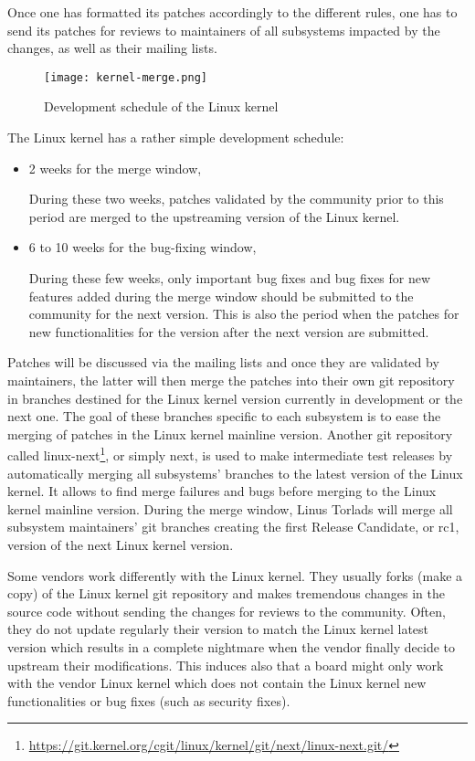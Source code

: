Once one has formatted its patches accordingly to the different rules, one has to send its patches for reviews to maintainers of all subsystems impacted by the changes, as well as their mailing lists.

\begin{figure}[H]
  \texttt{[image: kernel-merge.png]}
  \caption{Development schedule of the Linux kernel}
\end{figure}

The Linux kernel has a rather simple development schedule:
\begin{itemize}
  \item 2 weeks for the merge window,

During these two weeks, patches validated by the community prior to this period are merged to the upstreaming version of the Linux kernel.

  \item 6 to 10 weeks for the bug-fixing window,

During these few weeks, only important bug fixes and bug fixes for new features added during the merge window should be submitted to the community for the next version. This is also the period when the patches for new functionalities for the version after the next version are submitted.
\end{itemize}

Patches will be discussed via the mailing lists and once they are validated by maintainers, the latter will then merge the patches into their own git repository in branches destined for the Linux kernel version currently in development or the next one. The goal of these branches specific to each subsystem is to ease the merging of patches in the Linux kernel mainline version. Another git repository called linux-next\footnote{\url{https://git.kernel.org/cgit/linux/kernel/git/next/linux-next.git/}}, or simply next, is used to make intermediate test releases by automatically merging all subsystems' branches to the latest version of the Linux kernel. It allows to find merge failures and bugs before merging to the Linux kernel mainline version. During the merge window, Linus Torlads will merge all subsystem maintainers' git branches creating the first Release Candidate, or rc1, version of the next Linux kernel version.

Some vendors work differently with the Linux kernel. They usually forks (make a copy) of the Linux kernel git repository and makes tremendous changes in the source code without sending the changes for reviews to the community. Often, they do not update regularly their version to match the Linux kernel latest version which results in a complete nightmare when the vendor finally decide to upstream their modifications. This induces also that a board might only work with the vendor Linux kernel which does not contain the Linux kernel new functionalities or bug fixes (such as security fixes).


